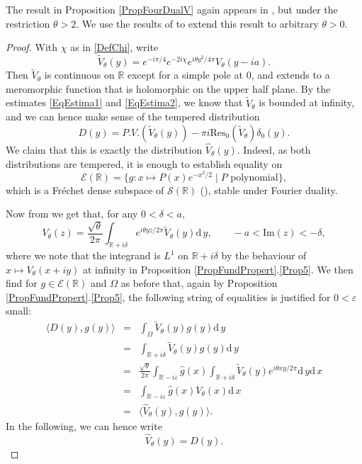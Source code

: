 \documentclass[11pt, reqno]{amsart}
\theoremstyle{definition}
\numberwithin{equation}{section}
\def\R{\mathbb R}
\def\Res{\mathrm{Res}}
\def\Sc{\mathcal S}
\newcommand{\rd}{\mathrm{d}\!\,}
\newcommand{\Imm}{\mathrm{Im}}
\newcommand{\Ec}{\mathcal{E}}
\begin{document}
The result in Proposition \ref{PropFourDualV} again appears in \cite[Appendix B]{Wor00}, but under the restriction $\theta>2$. We use the results of \cite[Appendix A]{Rui05} to extend this result to arbitrary $\theta >0$. 
\begin{proof}
With $\chi$ as in \eqref{DefChi}, write 
\[
\widetilde{V}_{\theta}(y) = e^{-i\pi/4} e^{-2i\chi}  e^{i\theta y^2/4\pi}  V_{\theta}(y-ia).
\]
Then $\widetilde{V}_{\theta}$ is continuous  on $\R$ except for a simple pole at $0$, and extends to a meromorphic function that is holomorphic on the upper half plane. By the estimates \eqref{EqEstima1} and \eqref{EqEstima2}, we know that $\widetilde{V}_{\theta}$ is bounded at infinity, and we can hence make sense of the tempered distribution 
\begin{equation}\label{EqDistributionDual}
D(y) = P.V.(\widetilde{V}_{\theta}(y)) - \pi i \Res_0(\widetilde{V}_{\theta})\delta_0(y).
\end{equation}
We claim that this is exactly the distribution $\hat{V}_{\theta}(y)$. Indeed, as both distributions are tempered, it is enough to establish equality on
\[
\Ec(\R) = \{g\colon  x \mapsto P(x) e^{-x^2/2}\mid P \textrm{ polynomial}\},
\]
which is a Fréchet dense subspace of $\Sc(\R)$ (\cite[Theorem V.13]{RS81}), stable under Fourier duality.

Now from \cite[(A.21)]{Rui05} we get that, for any $0<\delta<a$, 
\[
V_{\theta}(z) = \frac{\sqrt{\theta}}{2\pi} \int_{\R+i\delta} e^{i\theta yz/2\pi}\widetilde{V}_{\theta}(y)\rd y,\qquad -a<\Imm(z) <-\delta,
\]
where we note that the integrand is $L^1$ on $\R+i\delta$ by  the behaviour of $x\mapsto V_{\theta}(x+iy)$ at infinity in Proposition \ref{PropFundPropert}.\eqref{Prop5}. We then find for $g\in \Ec(\R)$ and $\Omega$ as before that, again by Proposition \ref{PropFundPropert}.\eqref{Prop5}, the following string of equalities is justified for $0<\varepsilon$ small: 
\begin{eqnarray*}
\langle D(y),g(y)\rangle &=& \int_{\Omega} \widetilde{V}_{\theta}(y) g(y) \rd y\\
&=& \int_{\R+ i\delta} \widetilde{V}_{\theta}(y)g(y)\rd y \\
&=& \frac{\sqrt{\theta}}{2\pi}\int_{\R-i\varepsilon} \hat{g}(x) \int_{\R+ i\delta} \widetilde{V}_{\theta}(y) e^{i\theta xy/2\pi} \rd y \rd x \\
&=& \int_{\R-i\varepsilon} \hat{g}(x) V_{\theta}(x)\rd x \\
&=& \langle \hat{V}_{\theta}(y),g(y)\rangle.
\end{eqnarray*} 
In the following, we can hence write 
\begin{equation}\label{EqFourTransPVV}
\hat{V}_{\theta}(y) = D(y).
\end{equation}


\end{proof}
\end{document}
